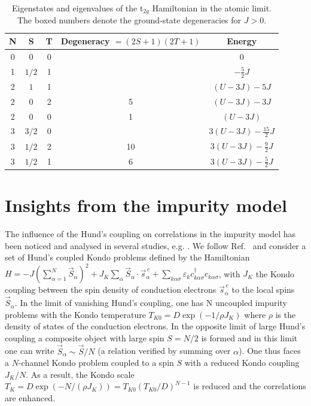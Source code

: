 \documentclass[aps,prl,amsmath, amssymb, english, aps, prl, onecolumn,
  reprint,floatfix, superscriptaddress]{revtex4-1}
\def\t2g{t${}_{2g}$}
\begin{document}

\begin{table}[h]
\begin{ruledtabular}
\begin{tabular}{c c c c c}
N & S & T & Degeneracy $=(2S+1)(2T+1)$ & Energy \\ 
\hline\hline
0 & 0 & 0 & \boxed{1} & 0 \\ \hline
1 & $1/2$ & 1 & \boxed{6} & $-\frac{5}{2} J$  \\ \hline
2 & $1$ & 1 & \boxed{9} & $(U-3J)-5 J$  \\ 
2 & $0$ & 2 & 5 & $(U-3J)-3J $ \\
2 & $0$ & 0 & 1 & $(U-3J) $ \\ \hline
3 & $3/2$ & 0 & \boxed{4} & $3(U-3J)-\frac{15}{2} J $ \\
3 & $1/2$ & 2 & 10 & $3(U-3J)-\frac{9}{2}J$ \\
3 & $1/2$ & 1 & 6 & $3(U-3J)-\frac{5}{2} J$ \\

\end{tabular}
\end{ruledtabular}
\caption{Eigenstates and eigenvalues of the \t2g Hamiltonian in the atomic limit. 
The boxed numbers denote the ground-state degeneracies for $J>0$.  
\label{table:eigen_system}} 
\end{table}


\section{Insights from the impurity model}
The influence of the Hund's coupling on correlations in the impurity
model has been noticed and analysed in several studies,
e.g. \cite{okada73,kusunose97, yanase97, yotsuhashi01, nishikawa10}.
We follow Ref.~\cite{nevidomskiy09} and consider a set of Hund's
coupled Kondo problems defined by the Hamiltonian $H= -J
(\sum_{\alpha=1}^N \vec{S}_\alpha )^2+ J_K \sum_\alpha \vec{S}_\alpha
\cdot \vec{s}^{\,c}_\alpha + \sum_{k \alpha\sigma}\varepsilon_k
c^\dagger_{k\alpha\sigma}c_{k\alpha\sigma}$, with $J_K$ the Kondo
coupling between the spin density of conduction electrons
$\vec{s}^{\,c}_\alpha$ to the local spins $\vec{S}_\alpha$.
%
In the limit of vanishing Hund's coupling, one
has N uncoupled impurity problems with the Kondo temperature
$T_{K0}=D\exp(-1/\rho J_K)$ where $\rho$ is the density of states of the 
conduction electrons. In the opposite limit of large Hund's coupling a
composite object with large spin $S=N/2$ is formed and in this limit
one can write $\vec{S}_\alpha \sim \vec{S}/N$ 
(a relation verified by summing over $\alpha$). One thus faces a 
$N$-channel Kondo problem coupled to a spin $S$ with
a reduced Kondo coupling $J_K/N$. 
As a result, the Kondo scale $T_K=D\exp(-N/(\rho
J_K))=T_{K0}(T_{K0}/D)^{N-1}$ is reduced and the correlations are
enhanced. 
\end{document}
